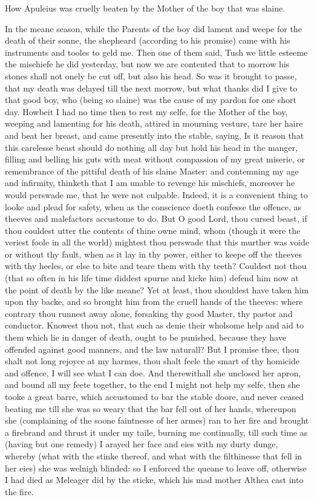 
How Apuleius was cruelly beaten by the Mother of the boy that was slaine.

In the meane season, while the Parents of the boy did lament and weepe for the
death of their sonne, the shepheard (according to his promise) came with his
instruments and tooles to geld me. Then one of them said, Tush we little
esteeme the mischiefe he did yesterday, but now we are contented that to morrow
his stones shall not onely be cut off, but also his head. So was it brought to
passe, that my death was delayed till the next morrow, but what thanks did I
give to that good boy, who (being so slaine) was the cause of my pardon for one
short day. Howbeit I had no time then to rest my selfe, for the Mother of the
boy, weeping and lamenting for his death, attired in mourning vesture, tare her
haire and beat her breast, and came presently into the stable, saying, Is it
reason that this carelesse beast should do nothing all day but hold his head in
the manger, filling and belling his guts with meat without compassion of my
great miserie, or remembrance of the pittiful death of his slaine Master: and
contemning my age and infirmity, thinketh that I am unable to revenge his
mischiefs, moreover he would perswade me, that he were not culpable. Indeed, it
is a convenient thing to looke and plead for safety, when as the conscience
doeth confesse the offence, as theeves and malefactors accustome to do. But O
good Lord, thou cursed beast, if thou couldest utter the contents of thine owne
mind, whom (though it were the veriest foole in all the world) mightest thou
perswade that this murther was voide or without thy fault, when as it lay in
thy power, either to keepe off the theeves with thy heeles, or else to bite and
teare them with thy teeth? Couldest not thou (that so often in his life time
diddest spurne and kicke him) defend him now at the point of death by the like
meane? Yet at least, thou shouldest have taken him upon thy backe, and so
brought him from the cruell hands of the theeves: where contrary thou runnest
away alone, forsaking thy good Master, thy pastor and conductor. Knowest thou
not, that such as denie their wholsome help and aid to them which lie in danger
of death, ought to be punished, because they have offended against good
manners, and the law naturall? But I promise thee, thou shalt not long rejoyce
at my harmes, thou shalt feele the smart of thy homicide and offence, I will
see what I can doe. And therewithall she unclosed her apron, and bound all my
feete together, to the end I might not help my selfe, then she tooke a great
barre, which accustomed to bar the stable doore, and never ceased beating me
till she was so weary that the bar fell out of her hands, whereupon she
(complaining of the soone faintnesse of her armes) ran to her fire and brought
a firebrand and thrust it under my taile, burning me continually, till such
time as (having but one remedy) I arayed her face and eies with my durty dunge,
whereby (what with the stinke thereof, and what with the filthinesse that fell
in her eies) she was welnigh blinded: so I enforced the queane to leave off,
otherwise I had died as Meleager did by the sticke, which his mad mother Althea
cast into the fire.

